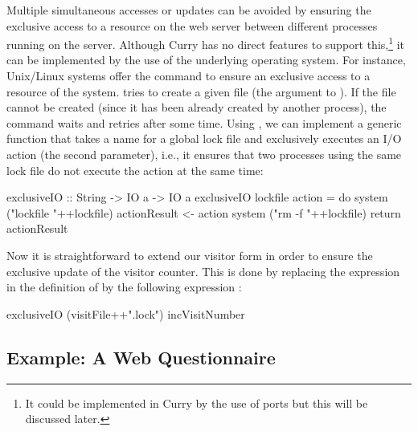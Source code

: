 Multiple simultaneous accesses or updates can be avoided
by ensuring the exclusive access to a resource on the web server
between different processes running on the server.
Although Curry has no direct features to support this,\footnote{%
It could be implemented in Curry by the use of ports but this
will be discussed later.}
it can be implemented by the use of the underlying
operating system. For instance, Unix/Linux systems
offer the command  to ensure
an exclusive access to a resource of the system.
 tries to create
a given file (the argument to ).
If the file cannot be created (since it has been already created
by another process), the  command waits
and retries after some time.
Using , we can implement a generic function
 that takes a name for a global lock file
and exclusively executes an I/O action (the second parameter),
i.e., it ensures that two processes using the same lock file
do not execute the action at the same time:
\begin{prog}
exclusiveIO :: String -> IO a -> IO a
exclusiveIO lockfile action =
  do system ("lockfile "++lockfile)
     actionResult <- action
     system ("rm -f "++lockfile)
     return actionResult
\end{prog}
Now it is straightforward to extend our visitor form
in order to ensure the exclusive update of the visitor counter.
This is done by replacing the expression 
in the definition of  by the following
expression :
\begin{prog}
exclusiveIO (visitFile++".lock") incVisitNumber
\end{prog}


\subsection{Example: A Web Questionnaire}

